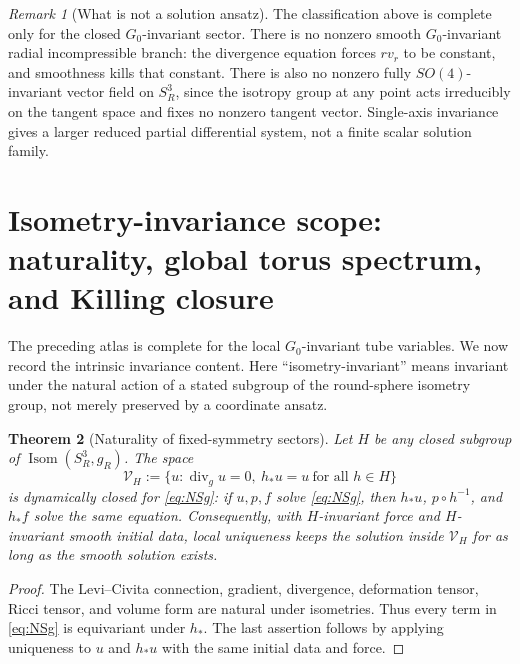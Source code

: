 \documentclass[aps,prd,reprint,superscriptaddress,nofootinbib,floatfix]{revtex4-2}
\newtheorem{theorem}{Theorem}
\theoremstyle{definition}
\theoremstyle{remark}
\newtheorem{remark}[theorem]{Remark}
\newcommand{\divg}{\operatorname{div}_g}
\newcommand{\cV}{\mathcal{V}}
\begin{document}
\begin{remark}[What is not a solution ansatz]
	The classification above is complete only for the closed $G_0$-invariant
	sector.  There is no nonzero smooth $G_0$-invariant radial incompressible branch:
	the divergence equation forces $rv_r$ to be constant, and smoothness kills that
	constant.  There is also no nonzero fully $SO(4)$-invariant vector field on
	$S^3_R$, since the isotropy group at any point acts irreducibly on the tangent
	space and fixes no nonzero tangent vector.  Single-axis invariance gives a
	larger reduced partial differential system, not a finite scalar solution family.
\end{remark}



\section{Isometry-invariance scope: naturality, global torus spectrum, and Killing closure}\label{sec:isometryinv}

The preceding atlas is complete for the local $G_0$-invariant tube variables.  We now record the intrinsic invariance content.  Here ``isometry-invariant'' means invariant under the natural action of a stated subgroup of the round-sphere isometry group, not merely preserved by a coordinate ansatz.

\begin{theorem}[Naturality of fixed-symmetry sectors]\label{thm:naturality}
	Let $H$ be any closed subgroup of $\operatorname{Isom}(S^3_R,g_R)$.  The space
	\begin{equation}
		\cV_H:=\{u:\divg u=0,\ h_*u=u\ \text{for all }h\in H\}
	\end{equation}
	is dynamically closed for \eqref{eq:NSg}: if $u,p,f$ solve \eqref{eq:NSg}, then
	$h_*u$, $p\circ h^{-1}$, and $h_*f$ solve the same equation.  Consequently, with
	$H$-invariant force and $H$-invariant smooth initial data, local uniqueness keeps the solution inside $\cV_H$ for as long as the smooth solution exists.
\end{theorem}

\begin{proof}
	The Levi--Civita connection, gradient, divergence, deformation tensor, Ricci tensor, and volume form are natural under isometries.  Thus every term in \eqref{eq:NSg} is equivariant under $h_*$.  The last assertion follows by applying uniqueness to $u$ and $h_*u$ with the same initial data and force.
\end{proof}
\end{document}
